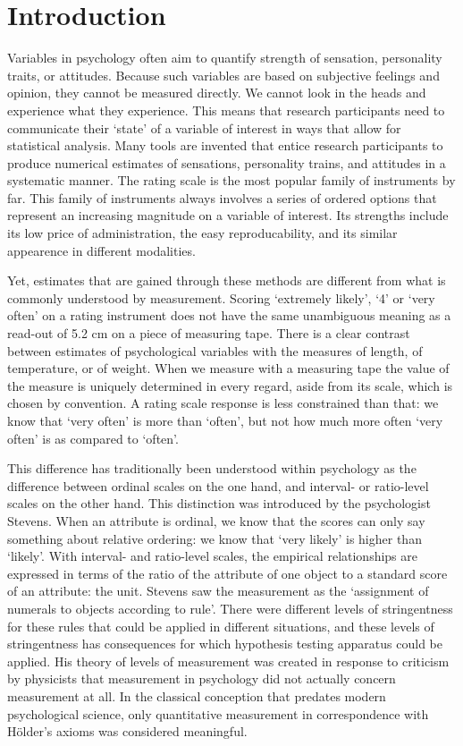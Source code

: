 \documentclass[utf8]{FrontiersinVancouver}
\begin{document}
\section{Introduction}
Variables in psychology often aim to quantify strength of sensation, personality traits, or attitudes. Because such variables are based on subjective feelings and opinion, they cannot be measured directly. We cannot look in the heads and experience what they experience. This means that research participants need to communicate their `state' of a variable of interest in ways that allow for statistical analysis. Many tools are invented that entice research participants to produce numerical estimates of sensations, personality trains, and attitudes in a systematic manner. The rating scale is the most popular family of instruments by far. This family of instruments always involves a series of ordered options that represent an increasing magnitude on a variable of interest. Its strengths include its low price of administration, the easy reproducability, and its similar appearence in different modalities. 

Yet, estimates that are gained through these methods are different from what is commonly understood by measurement. Scoring `extremely likely', `4' or `very often' on a rating instrument does not have the same unambiguous meaning as a read-out of 5.2 cm on a piece of measuring tape. There is a clear contrast between estimates of psychological variables with the measures of length, of temperature, or of weight. When we measure with a measuring tape the value of the measure is uniquely determined in every regard, aside from its scale, which is chosen by convention. A rating scale response is less constrained than that: we know that `very often' is more than `often', but not how much more often `very often' is as compared to `often'.

This difference has traditionally been understood within psychology as the difference between ordinal scales on the one hand, and interval- or ratio-level scales on the other hand. This distinction was introduced by the psychologist Stevens. When an attribute is ordinal, we know that the scores can only say something about relative ordering: we know that `very likely' is higher than `likely'. With interval- and ratio-level scales, the empirical relationships are expressed in terms of the ratio of the attribute of one object to a standard score of an attribute: the unit. Stevens saw the measurement as the `assignment of numerals to objects according to rule'. There were different levels of stringentness for these rules that could be applied in different situations, and these levels of stringentness has consequences for which hypothesis testing apparatus could be applied. His theory of levels of measurement was created in response to criticism by physicists that measurement in psychology did not actually concern measurement at all. In the classical conception that predates modern psychological science, only quantitative measurement in correspondence with Hölder's axioms was considered meaningful.
\end{document}
